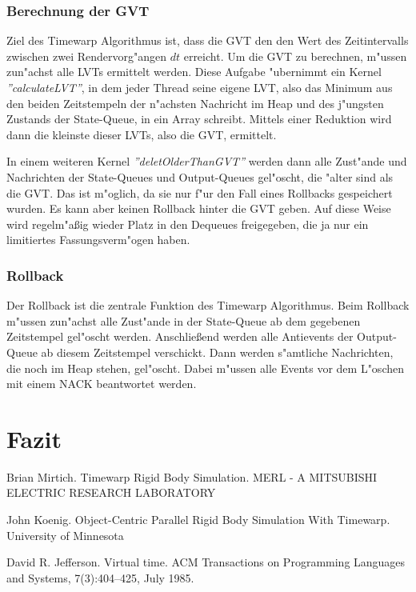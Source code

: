\documentclass[a4paper, 10pt, openright, parskip, chapterprefix]{scrreprt}
\begin{document}
\subsection{Berechnung der GVT}
Ziel des Timewarp Algorithmus ist, dass die GVT den den Wert des Zeitintervalls zwischen zwei Rendervorg"angen $dt$
erreicht. Um die GVT zu berechnen, m"ussen zun"achst alle LVTs ermittelt werden. Diese Aufgabe "ubernimmt ein Kernel
\emph{''calculateLVT''}, in dem jeder Thread seine eigene LVT, also das Minimum aus den beiden Zeitstempeln der
n"achsten Nachricht im Heap und des j"ungsten Zustands der State-Queue, in ein Array schreibt. Mittels einer Reduktion
wird dann die kleinste dieser LVTs, also die GVT, ermittelt.

In einem weiteren Kernel \emph{''deletOlderThanGVT''} werden dann alle Zust"ande und Nachrichten der State-Queues und
Output-Queues gel"oscht, die "alter sind als die GVT. Das ist m"oglich, da sie nur f"ur den Fall eines Rollbacks
gespeichert wurden. Es kann aber keinen Rollback hinter die GVT geben. Auf diese Weise wird regelm"a\ss ig wieder Platz
in den Dequeues freigegeben, die ja nur ein limitiertes Fassungsverm"ogen haben.

\subsection{Rollback}
\label{subsec:Rollback}
Der Rollback ist die zentrale Funktion des Timewarp Algorithmus. Beim Rollback m"ussen zun"achst alle Zust"ande in der
State-Queue ab dem gegebenen Zeitstempel gel"oscht werden. Anschlie\ss end werden alle Antievents der Output-Queue ab
diesem Zeitstempel verschickt. Dann werden s"amtliche Nachrichten, die noch im Heap stehen, gel"oscht. Dabei m"ussen
alle Events vor dem L"oschen mit einem NACK beantwortet werden.

\chapter{Fazit}
\begin{thebibliography}{10}
Brian Mirtich. Timewarp Rigid Body Simulation. MERL - A MITSUBISHI ELECTRIC RESEARCH LABORATORY

John Koenig. Object-Centric Parallel Rigid Body Simulation With Timewarp. University of Minnesota

David R. Jefferson. Virtual time. ACM Transactions on Programming Languages and Systems, 7(3):404–425, July 1985.
\end{thebibliography}
\end{document}
